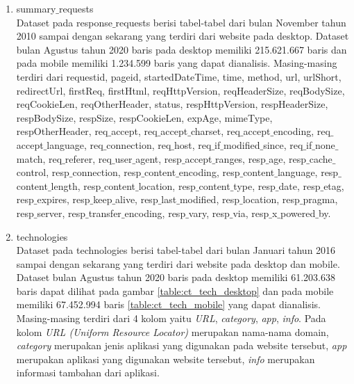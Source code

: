 \begin{enumerate}
	\item summary$\_$requests\\
	Dataset pada response$\_$requests berisi tabel-tabel dari bulan November tahun 2010 sampai dengan sekarang yang terdiri dari website pada desktop. Dataset bulan Agustus tahun 2020 baris pada desktop memiliki 215.621.667 baris dan pada mobile memiliki 1.234.599 baris yang dapat dianalisis. Masing-masing terdiri dari requestid, pageid, startedDateTime, time, method, url, urlShort, redirectUrl, firstReq, firstHtml, reqHttpVersion, reqHeaderSize, reqBodySize, reqCookieLen, reqOtherHeader, status, respHttpVersion, respHeaderSize, respBodySize, respSize, respCookieLen, expAge, mimeType, respOtherHeader, req$\_$accept, req$\_$accept$\_$charset, req$\_$accept$\_$encoding, req$\_$accept$\_$language, req$\_$connection, req$\_$host, req$\_$if$\_$modified$\_$since, req$\_$if$\_$none$\_$match, req$\_$referer, req$\_$user$\_$agent, resp$\_$accept$\_$ranges, resp$\_$age, resp$\_$cache$\_$control, resp$\_$connection, resp$\_$content$\_$encoding, resp$\_$content$\_$language, resp$\_$content$\_$length, resp$\_$content$\_$location, resp$\_$content$\_$type, resp$\_$date, resp$\_$etag, resp$\_$expires, resp$\_$keep$\_$alive, resp$\_$last$\_$modified, resp$\_$location, resp$\_$pragma, resp$\_$server, resp$\_$transfer$\_$encoding, resp$\_$vary, resp$\_$via, resp$\_$x$\_$powered$\_$by.
	\item technologies\\
	Dataset pada technologies berisi tabel-tabel dari bulan Januari tahun 2016 sampai dengan sekarang yang terdiri dari website pada desktop dan mobile. Dataset bulan Agustus tahun 2020 baris pada desktop memiliki 61.203.638 baris  dapat dilihat pada gambar \ref{table:ct_tech_desktop} dan pada mobile memiliki 67.452.994 baris \ref{table:ct_tech_mobile} yang dapat dianalisis. Masing-masing terdiri dari 4 kolom yaitu \textit{URL}, \textit{category}, \textit{app}, \textit{info}. Pada kolom \textit{URL (Uniform Resource Locator)} merupakan nama-nama domain, \textit{category} merupakan jenis aplikasi yang digunakan pada website tersebut, \textit{app} merupakan aplikasi yang digunakan website tersebut, \textit{info} merupakan informasi tambahan dari aplikasi. 
	

\end{enumerate}
